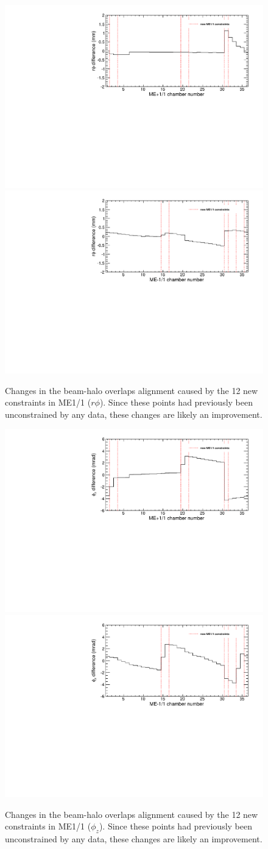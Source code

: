 \documentclass[12pt]{article}
\begin{document}
\begin{figure}
\includegraphics[width=0.5\linewidth]{newconstraintsPlus.pdf}
\includegraphics[width=0.5\linewidth]{newconstraintsMinus.pdf}

\caption{Changes in the beam-halo overlaps alignment caused by the 12
  new constraints in ME1/1 ($r\phi$).  Since these points had
  previously been unconstrained by any data, these changes are likely
  an improvement. \label{fig:newconstraints}}
\end{figure}

\begin{figure}
\includegraphics[width=0.5\linewidth]{newconstraintsPlusPhiZ.pdf}
\includegraphics[width=0.5\linewidth]{newconstraintsMinusPhiZ.pdf}

\caption{Changes in the beam-halo overlaps alignment caused by the 12
  new constraints in ME1/1 ($\phi_z$).  Since these points had
  previously been unconstrained by any data, these changes are likely
  an improvement. \label{fig:newconstraintsPhiZ}}
\end{figure}
\end{document}
